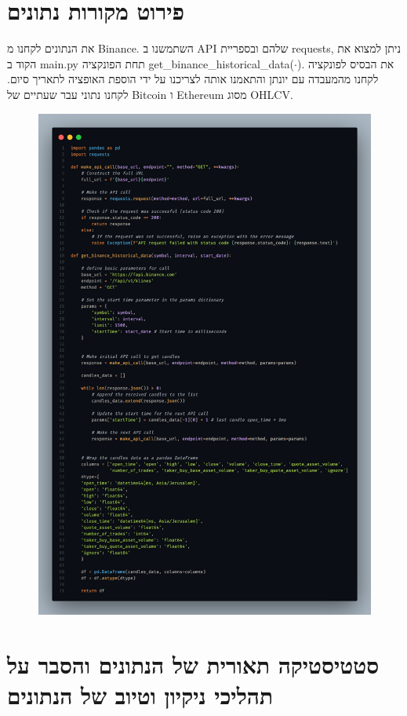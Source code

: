 \documentclass[a4paper,11pt]{article}
\newcommand{\te}[1]{\textenglish{#1}}
\begin{document}
\begin{RTL}
\section{פירוט מקורות נתונים}
את הנתונים לקחנו מ \te{Binance}. השתמשנו ב \te{API} שלהם ובספריית \te{requests}, ניתן למצוא את הקוד ב \te{main.py} תחת הפונקציה \te{get\_binance\_historical\_data($\cdot$)}. את הבסיס לפונקציה לקחנו מהמעבדה עם יונתן והתאמנו אותה לצריכנו על ידי הוספת האופציה לתאריך סיום. לקחנו נתוני עבר שעתיים של \te{Bitcoin} ו \te{Ethereum} מסוג \te{OHLCV}.
\begin{figure}[H]
    \centering
    \includegraphics[width=.75\textwidth]{Data.png}
\end{figure}
\newpage
\section{סטטיסטיקה תאורית של הנתונים והסבר על תהליכי ניקיון וטיוב של הנתונים}

\end{RTL}
\end{document}
